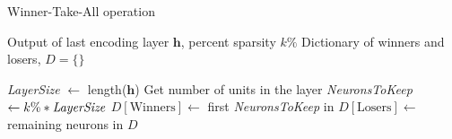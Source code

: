 %
%
%
%
%


\begin{algorithm}
    \caption{Winner-Take-All operation}
    \label{algo:wta}
    \begin{algorithmic}[1]
    
    \INPUT Output of last encoding layer $\mathbf{h}$, percent sparsity $k\%$
    \OUTPUT Dictionary of winners and losers, $D = \{\}$

    \item[]
    \State \textit{LayerSize} $\gets$ length($\mathbf{h}$)
    \Comment Get number of units in the layer
    \State \textit{NeuronsToKeep} $\gets k\% * \text{\textit{LayerSize}}$
    \State $D[\text{Winners}] \gets$ first \textit{NeuronsToKeep} in 
    \State $D[\text{Losers}] \gets$ remaining neurons in 
    \State \Return $D$
    \end{algorithmic}
\end{algorithm}
